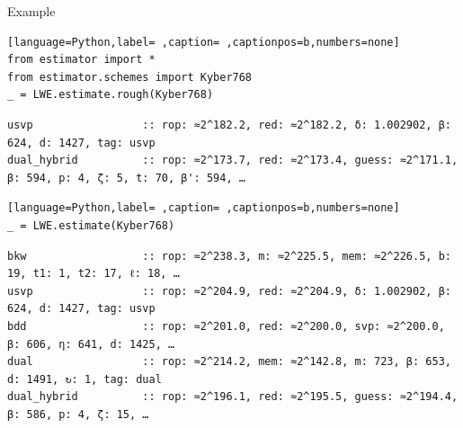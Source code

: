 \documentclass[table,10pt,aspectratio=169]{beamer}
\begin{document}
\begin{frame}[label={sec:orgf04cc6c},fragile]{Example}
 \begin{lstlisting}[language=Python,label= ,caption= ,captionpos=b,numbers=none]
from estimator import *
from estimator.schemes import Kyber768
_ = LWE.estimate.rough(Kyber768)
\end{lstlisting}

\begin{verbatim}
usvp                 :: rop: ≈2^182.2, red: ≈2^182.2, δ: 1.002902, β: 624, d: 1427, tag: usvp
dual_hybrid          :: rop: ≈2^173.7, red: ≈2^173.4, guess: ≈2^171.1, β: 594, p: 4, ζ: 5, t: 70, β': 594, …
\end{verbatim}


\begin{lstlisting}[language=Python,label= ,caption= ,captionpos=b,numbers=none]
_ = LWE.estimate(Kyber768)
\end{lstlisting}

\begin{verbatim}
bkw                  :: rop: ≈2^238.3, m: ≈2^225.5, mem: ≈2^226.5, b: 19, t1: 1, t2: 17, ℓ: 18, …
usvp                 :: rop: ≈2^204.9, red: ≈2^204.9, δ: 1.002902, β: 624, d: 1427, tag: usvp
bdd                  :: rop: ≈2^201.0, red: ≈2^200.0, svp: ≈2^200.0, β: 606, η: 641, d: 1425, …
dual                 :: rop: ≈2^214.2, mem: ≈2^142.8, m: 723, β: 653, d: 1491, ↻: 1, tag: dual
dual_hybrid          :: rop: ≈2^196.1, red: ≈2^195.5, guess: ≈2^194.4, β: 586, p: 4, ζ: 15, …
\end{verbatim}
\end{frame}
\end{document}
